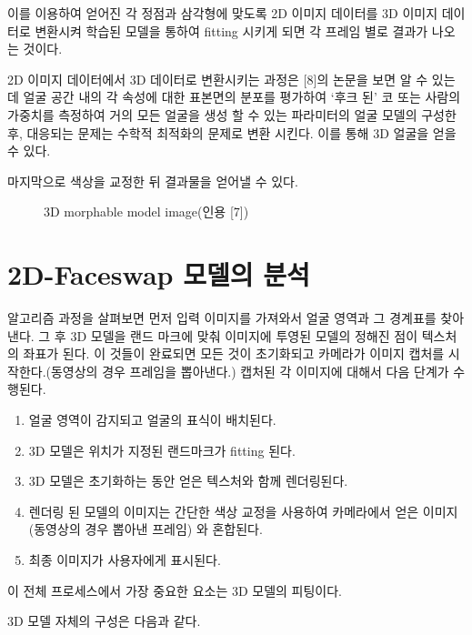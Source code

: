 이를 이용하여 얻어진 각 정점과 삼각형에 맞도록 2D 이미지 데이터를 3D 이미지 데이터로 변환시켜 학습된 모델을 통하여 fitting 시키게 되면 각 프레임 별로 결과가 나오는 것이다.

2D 이미지 데이터에서 3D 데이터로 변환시키는 과정은 [8]의 논문을 보면 알 수 있는데 
얼굴 공간 내의 각 속성에 대한 표본면의 분포를 평가하여 ‘후크 된’ 코 또는 사람의 가중치를 측정하여 거의 모든 얼굴을 생성 할 수 있는 파라미터의 얼굴 모델의 구성한 후, 대응되는 문제는 수학적 최적화의 문제로 변환 시킨다. 이를 통해 3D 얼굴을 얻을 수 있다.

마지막으로 색상을 교정한 뒤 결과물을 얻어낼 수 있다.

\begin{figure}[h!]
\centering
\caption{ 3D morphable model image(인용 [7])}
\end{figure}


\section{2D-Faceswap 모델의 분석}

알고리즘 과정을 살펴보면 먼저 입력 이미지를 가져와서 얼굴 영역과 그 경계표를 찾아낸다. 그 후 3D 모델을 랜드 마크에 맞춰 이미지에 투영된 모델의 정해진 점이 텍스처의 좌표가 된다. 이 것들이 완료되면 모든 것이 초기화되고 카메라가 이미지 캡처를 시작한다.(동영상의 경우 프레임을 뽑아낸다.) 캡처된 각 이미지에 대해서 다음 단계가 수행된다.

\begin{enumerate}
    \item 얼굴 영역이 감지되고 얼굴의 표식이 배치된다.
    \item 3D 모델은 위치가 지정된 랜드마크가 fitting 된다.
    \item 3D 모델은 초기화하는 동안 얻은 텍스처와 함께 렌더링된다.
    \item 렌더링 된 모델의 이미지는 간단한 색상 교정을 사용하여 카메라에서 얻은 이미지(동영상의 경우 뽑아낸 프레임) 와 혼합된다.
    \item 최종 이미지가 사용자에게 표시된다.
\end{enumerate}

이 전체 프로세스에서 가장 중요한 요소는 3D 모델의 피팅이다. 

3D 모델 자체의 구성은 다음과 같다.

